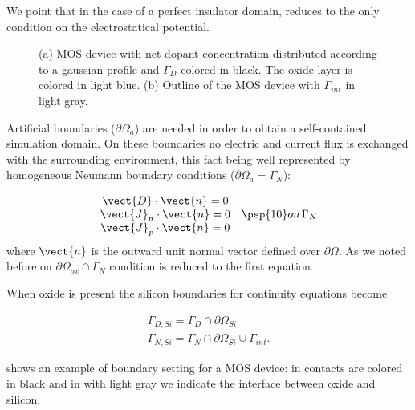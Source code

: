 We point that in the case of a perfect insulator domain,  reduces to the only condition on the electrostatical potential.

\begin{figure}[!b]
\centering
{}
\caption{(a) MOS device with net dopant concentration distributed according to a gaussian profile and $\Gamma_D$ colored in black. The oxide layer is colored in light blue. (b) Outline of the MOS device with $\Gamma_{int}$ in light gray. }
\label{fig: outline boundaries}
\end{figure}

Artificial boundaries ($\partial \Omega_a$) are needed in order to obtain a self-contained simulation domain.  On these boundaries no electric and current flux is exchanged with the surrounding environment, this fact being well represented by homogeneous Neumann boundary conditions ($\partial \Omega_a = \Gamma_N$):

\begin{equation}
\label{eq: neumann boundar condition}
\begin{array}{cc}
\vect{D}\cdot \vect{n} = 0 & \\
\vect{J}_n \cdot \vect{n} = 0 & \psp{10} on \, \Gamma_N \\
\vect{J}_p \cdot \vect{n} = 0 & 
\end{array}
\end{equation}
where $\vect{n}$ is the outward unit normal vector defined over $\partial \Omega$. 
As we noted before on $\partial \Omega_{ox} \cap \Gamma_N$ condition  is reduced to the first equation.

When oxide is present the silicon boundaries for continuity equations become

\begin{equation}
\begin{array}{c}
\Gamma_{D,Si} = \Gamma_D \cap \partial \Omega_{Si} \\
\Gamma_{N,Si} = \Gamma_N \cap \partial \Omega_{Si} \cup \Gamma_{int}.
\end{array}
\end{equation}

 shows an example of boundary setting for a MOS device: in  contacts are colored in black and in  with light gray we indicate the interface between oxide and silicon.

